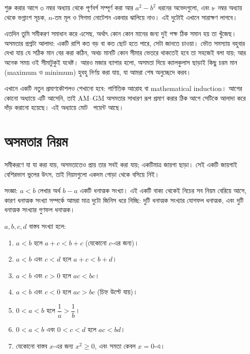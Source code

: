 \documentclass[11pt]{article}
\begin{document}

\noindent
শুরু করার আগে ৩ নম্বর অধ্যায় থেকে পূর্ণবর্গ সম্পূর্ণ করা আর $a^2 - b^2$
ধরনের অভেদগুলো, এবং ৮ নম্বর অধ্যায় থেকে ভগ্নাংশ সূচক, $n$-তম মূল ও সিগমা
নোটেশন একবার ঝালিয়ে নাও। এই দুটোই এখানে সারাক্ষণ লাগবে।

এতদিন তুমি সমীকরণ সমাধান করে এসেছ, অর্থাৎ কোন কোন মানের জন্য দুই পক্ষ ঠিক সমান
হয় তা খুঁজেছ। অসমতার প্রশ্নটা আলাদা: একটি রাশি কত বড় বা কত ছোট হতে পারে, সেটা
জানতে চাওয়া। ভৌত সমস্যায় বহুবার দেখা যায় যে সঠিক মান বের করা কঠিন, অথচ মানটি
কোন সীমার ভেতরে থাকতেই হবে তা সহজেই বলা যায়; আর অনেক সময় ওই সীমাটুকুই যথেষ্ট।
আরও মজার ব্যাপার হলো, অসমতা দিয়ে ক্যালকুলাস ছাড়াই কিছু চরম মান (maximum ও
minimum) হুবহু নির্ণয় করা যায়, যা আমরা শেষ অনুচ্ছেদে করব।

এখানে একটি নতুন প্রমাণকৌশলও শেখানো হবে: গাণিতিক আরোহ বা mathematical induction।
আগের কোনো অধ্যায়ে এটি আসেনি, তাই AM--GM অসমতার সাধারণ রূপ প্রমাণ করার ঠিক
আগে সেটিকে আলাদা করে দাঁড় করানো হয়েছে। এই অধ্যায়ে মোট \totalpoints\
পয়েন্ট আছে।

\section{অসমতার নিয়ম}

সমীকরণে যা যা করা যায়, অসমতাতেও প্রায় তার সবই করা যায়; একটিমাত্র জায়গা ছাড়া।
সেই একটি জায়গাই বেশিরভাগ ভুলের উৎস, তাই নিয়মগুলো একদম গোড়া থেকে বসিয়ে নিই।

সংজ্ঞা: $a < b$ লেখার অর্থ $b - a$ একটি ধনাত্মক সংখ্যা। এই একটি বাক্য থেকেই
নিচের সব নিয়ম বেরিয়ে আসে, কারণ ধনাত্মক সংখ্যা সম্পর্কে আমরা মাত্র দুটো জিনিস
ধরে নিচ্ছি: দুটি ধনাত্মক সংখ্যার যোগফল ধনাত্মক, এবং দুটি ধনাত্মক সংখ্যার গুণফল
ধনাত্মক।

\begin{idea}[অসমতার মৌলিক নিয়ম]
$a, b, c, d$ বাস্তব সংখ্যা হলে:
\begin{enumerate}
  \item $a < b$ হলে $a + c < b + c$ (যেকোনো $c$-এর জন্য)।
  \item $a < b$ এবং $c < d$ হলে $a + c < b + d$।
  \item $a < b$ এবং $c > 0$ হলে $ac < bc$।
  \item $a < b$ এবং $c < 0$ হলে $ac > bc$ (চিহ্ন উল্টে যায়)।
  \item $0 < a < b$ হলে $\dfrac{1}{a} > \dfrac{1}{b}$।
  \item $0 < a < b$ এবং $0 < c < d$ হলে $ac < bd$।
  \item যেকোনো বাস্তব $x$-এর জন্য $x^2 \geq 0$, এবং সমতা কেবল $x = 0$-এ।
\end{enumerate}
\end{idea}
\end{document}
